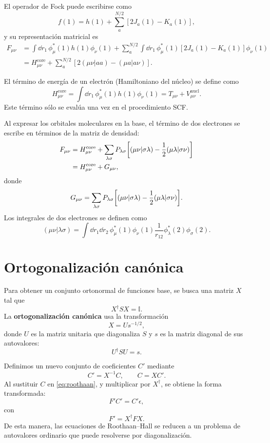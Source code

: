 \documentclass[11pt]{article}
\begin{document}
El operador de Fock puede escribirse como
\[
f(1) = h(1) + \sum_a^{N/2}[2J_a(1) - K_a(1)],
\]
y su representación matricial es
\begin{align*}
F_{\mu\nu}
&= \int \dd{r_1}\,\phi_\mu^*(1)h(1)\phi_\nu(1)
+ \sum_a^{N/2}\!\int \dd{r_1}\,\phi_\mu^*(1)[2J_a(1)-K_a(1)]\phi_\nu(1) \\
&= H_{\mu\nu}^{\text{core}} + \sum_a^{N/2}[2(\mu\nu|aa) - (\mu a|a\nu)].
\end{align*}

El término de energía de un electrón (Hamiltoniano del núcleo) se define como
\[
H_{\mu\nu}^{\text{core}} = \int \dd{r_1}\,\phi_\mu^*(1)h(1)\phi_\nu(1)
= T_{\mu\nu} + V_{\mu\nu}^{\text{nucl}}.
\]
Este término sólo se evalúa una vez en el procedimiento SCF.

Al expresar los orbitales moleculares en la base, el término de dos electrones se escribe en términos de la matriz de densidad:
\begin{align*}
F_{\mu\nu}
&= H_{\mu\nu}^{\text{core}} + \sum_{\lambda\sigma}
P_{\lambda\sigma}\qty[(\mu\nu|\sigma\lambda) - \frac{1}{2}(\mu\lambda|\sigma\nu)] \\
&= H_{\mu\nu}^{\text{core}} + G_{\mu\nu},
\end{align*}
donde
\begin{equation}
\label{eq:Gmat}
G_{\mu\nu} = \sum_{\lambda\sigma}
P_{\lambda\sigma}\qty[(\mu\nu|\sigma\lambda) - \frac{1}{2}(\mu\lambda|\sigma\nu)].
\end{equation}
Los integrales de dos electrones se definen como
\[
(\mu\nu|\lambda\sigma) = \int\!\!\dd{r_1}\dd{r_2}\,
\phi_\mu^*(1)\phi_\nu(1)\frac{1}{r_{12}}\phi_\lambda^*(2)\phi_\sigma(2).
\]

\section{Ortogonalización canónica}
\label{sec:orthogonalization}

Para obtener un conjunto ortonormal de funciones base, se busca una matriz \( X \) tal que
\[
X^\dagger S X = \mathbb{I}.
\]
La \textbf{ortogonalización canónica} usa la transformación
\begin{equation}
\label{eq:Xmat}
X = U s^{-1/2},
\end{equation}
donde \( U \) es la matriz unitaria que diagonaliza \( S \) y \( s \) es la matriz diagonal de sus autovalores:
\[
U^\dagger S U = s.
\]

Definimos un nuevo conjunto de coeficientes \( C' \) mediante
\begin{equation}
\label{eq:Ctrans}
C' = X^{-1}C, \qquad C = X C'.
\end{equation}
Al sustituir \( C \) en \eqref{eq:roothaan}, y multiplicar por \( X^\dagger \), se obtiene la forma transformada:
\begin{equation}
\label{eq:rooth-trans}
F' C' = C' \epsilon,
\end{equation}
con
\begin{equation}
\label{eq:Ftrans}
F' = X^\dagger F X.
\end{equation}
De esta manera, las ecuaciones de Roothaan–Hall se reducen a un problema de autovalores ordinario que puede resolverse por diagonalización.
\end{document}
